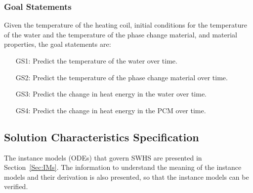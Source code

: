 \documentclass[12pt]{article}
\begin{document}
\subsubsection{Goal Statements}
\label{Sec:GSs}
Given the temperature of the heating coil, initial conditions for the temperature of the water and the temperature of the phase change material, and material properties, the goal statements are:
\begin{itemize}
\item[GS1:]Predict the temperature of the water over time.
\item[GS2:]Predict the temperature of the phase change material over time.
\item[GS3:]Predict the change in heat energy in the water over time.
\item[GS4:]Predict the change in heat energy in the PCM over time.
\end{itemize}
\subsection{Solution Characteristics Specification}
\label{Sec:SCS}
The instance models (ODEs) that govern SWHS are presented in Section~\ref{Sec:IMs}. The information to understand the meaning of the instance models and their derivation is also presented, so that the instance models can be verified.
\end{document}
